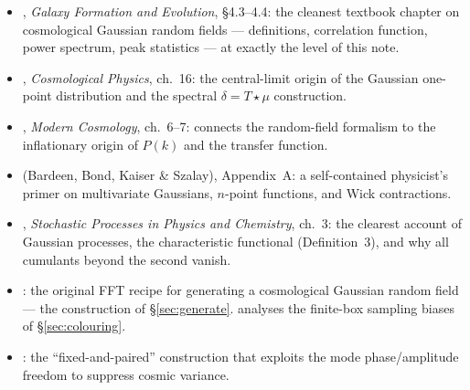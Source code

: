\documentclass[12pt]{article}
\begin{document}
\begin{itemize}
  \item \citet{MoBoschWhite2010}, \emph{Galaxy Formation and Evolution},
        \S4.3--4.4: the cleanest textbook chapter on cosmological
        Gaussian random fields --- definitions, correlation function,
        power spectrum, peak statistics --- at exactly the level of this
        note.
  \item \citet{Peacock1999}, \emph{Cosmological Physics}, ch.~16: the
        central-limit origin of the Gaussian one-point distribution and
        the spectral $\delta = T\star\mu$ construction.
  \item \citet{DodelsonSchmidt2020}, \emph{Modern Cosmology}, ch.~6--7:
        connects the random-field formalism to the inflationary origin of
        $P(k)$ and the transfer function.
  \item \citet{BBKS1986} (Bardeen, Bond, Kaiser \& Szalay), Appendix~A:
        a self-contained physicist's primer on multivariate Gaussians,
        $n$-point functions, and Wick contractions.
  \item \citet{vanKampen2007}, \emph{Stochastic Processes in Physics and
        Chemistry}, ch.~3: the clearest account of Gaussian processes,
        the characteristic functional (Definition~3), and why all
        cumulants beyond the second vanish.
  \item \citet{Pen1997}: the original FFT recipe for generating a
        cosmological Gaussian random field --- the construction of
        \S\ref{sec:generate}.  \citet{Sirko2005} analyses the finite-box
        sampling biases of \S\ref{sec:colouring}.
  \item \citet{AnguloPontzen2016}: the ``fixed-and-paired'' construction
        that exploits the mode phase/amplitude freedom to suppress cosmic
        variance.
\end{itemize}
\end{document}
